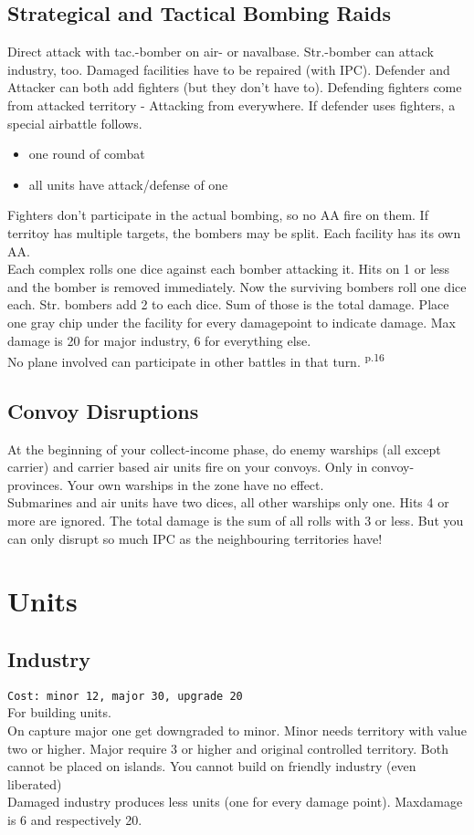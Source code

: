 \documentclass[10pt,a4paper,landscape]{article}
\begin{document}
\begin{multicols*}{3}
\subsection*{Strategical and Tactical Bombing Raids}
Direct attack with tac.-bomber on air- or navalbase. Str.-bomber can attack industry, too.
Damaged facilities have to be repaired (with IPC). Defender and Attacker can both add fighters (but they don't have to). Defending fighters come from attacked territory - Attacking from everywhere. If defender uses fighters, a special airbattle follows. 
\begin{itemize}
\item one round of combat
\item all units have attack/defense of one
\end{itemize}
Fighters don't participate in the actual bombing, so no AA fire on them. If territoy has multiple targets, the bombers may be split. Each facility has its own AA.\\
Each complex rolls one dice against each bomber attacking it. Hits on 1 or less and the bomber is removed immediately. Now the surviving bombers roll one dice each. Str. bombers add 2 to each dice. Sum of those is the total damage. Place one gray chip under the facility for every damagepoint to indicate damage. Max damage is 20 for major industry, 6 for everything else.\\
No plane involved can participate in other battles in that turn. \textsuperscript{p.16}

\subsection*{Convoy Disruptions}
At the beginning of your collect-income phase, do enemy warships (all except carrier) and carrier based air units fire on your convoys. Only in convoy-provinces. Your own warships in the zone have no effect.\\
Submarines and air units have two dices, all other warships only one. Hits 4 or more are ignored. The total damage is the sum of all rolls with 3 or less. But you can only disrupt so much IPC as the neighbouring territories have!

\pagebreak

\section*{Units}
\subsection*{Industry}
\texttt{Cost: minor 12, major 30, upgrade 20}\\
For building units.\\
On capture major one get downgraded to minor.
Minor needs territory with value two or higher. Major require 3 or higher and original controlled territory. Both cannot be placed on islands. You cannot build on friendly industry (even liberated)\\
Damaged industry produces less units (one for every damage point). Maxdamage is 6 and respectively 20.


\end{multicols*}
\end{document}
